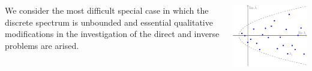 \documentclass[a0paper,25pt]{tikzposter} %
\begin{document}
\begin{columns}
{%
We consider the most difficult special case in which 
the discrete spectrum is unbounded and essential qualitative modifications in the investigation of the direct and inverse problems are arised. 
\begin{tikzfigure}
\includegraphics[scale=1]{spectra.pdf}
\end{tikzfigure}
}




 \end{columns}
\end{document}
